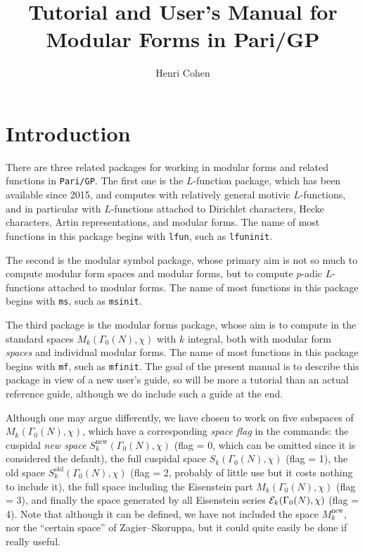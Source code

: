 \documentclass[11pt]{article}
\newcommand{\G}{\Gamma}
\newcommand{\new}{\text{new}}
\def\kbd#1{{\tt #1}}
\begin{document}
\pagestyle{plain}

\title{Tutorial and User's Manual for Modular Forms in Pari/GP}
\author{Henri Cohen}

\maketitle

\smallskip

\section{Introduction}

There are three related packages for working in modular forms and related
functions in \kbd{Pari/GP}. The first one is the $L$-function package, which
has been available since 2015, and computes with relatively general motivic
$L$-functions, and in particular with $L$-functions attached to Dirichlet
characters, Hecke characters, Artin representations, and modular forms.
The name of most functions in this package begins with \kbd{lfun}, such as
\kbd{lfuninit}.

The second is the modular symbol package, whose primary aim
is not so much to compute modular form spaces and modular forms, but to
compute $p$-adic $L$-functions attached to modular forms. The name of most
functions in this package begins with \kbd{ms}, such as \kbd{msinit}.

The third package is the modular forms package, whose aim is to compute in
the standard spaces $M_k(\G_0(N),\chi)$ with $k$ integral, both with modular
form \emph{spaces} and individual modular forms. The name of most functions in
this package begins with \kbd{mf}, such as \kbd{mfinit}. The goal of the
present manual is to describe this package in view of a new user's guide, so
will be more a tutorial than an actual reference guide, although we do include
such a guide at the end.

\medskip

Although one may argue differently, we have chosen to work on five
subspaces of $M_k(\G_0(N),\chi)$, which have a corresponding \emph{space flag}
in the commands: the cuspidal \emph{new space} $S_k^{\new}(\G_0(N),\chi)$
(flag = 0, which can be omitted since it is considered the default), the
full cuspidal space $S_k(\G_0(N),\chi)$ (flag = 1), the old space
$S_k^{\text{old}}(\G_0(N),\chi)$ (flag = 2, probably of little use but it
costs nothing to include it), the full space including the Eisenstein part
$M_k(\G_0(N),\chi)$ (flag = 3), and finally the space generated by all
Eisenstein series ${\cal E}_k(\G_0(N),\chi)$ (flag = 4). Note that although it
can be defined, we have not included the space $M_k^{\new}$, nor the
``certain space'' of Zagier--Skoruppa, but it could quite easily be done
if really useful.
\end{document}

